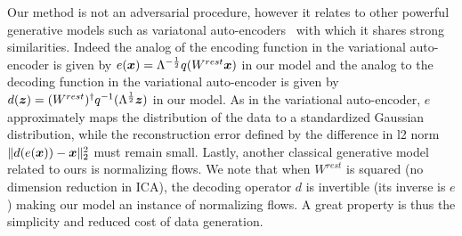 Our method is not an adversarial procedure, however it relates to other
powerful generative models such as variatonal
auto-encoders~\cite{kingma2013auto} with which it shares strong similarities.
Indeed the analog of the encoding function in the variational auto-encoder is
given by $e(\boldsymbol{x}) = \Lambda^{-\frac12}q(W^{rest} \boldsymbol{x})$ in our model and the analog to the decoding
function in the variational auto-encoder is given by $d(\boldsymbol{z}) =
(W^{rest})^{\dagger}q^{-1}(\Lambda^{\frac12}\boldsymbol{z})$ in our model. As in the variational auto-encoder, $e$ approximately maps the distribution of the data to a standardized Gaussian distribution,
while the reconstruction error defined by the difference in l2 norm
$\|d(e(\boldsymbol{x})) - \boldsymbol{x}\|^2_2$ must remain small.
Lastly, another classical generative model related to ours is normalizing
flows.  We note that when $W^{rest}$ is squared (no dimension reduction in ICA), the decoding operator $d$ is invertible (its inverse is $e$) making our
model an instance of normalizing flows. 
%
A great property is thus the simplicity and reduced cost of data generation.


